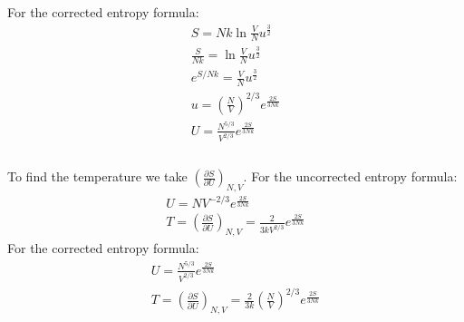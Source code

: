 \documentclass[a4paper,12pt]{article}
\numberwithin{equation}{section}
\begin{document}
For the corrected entropy formula:
\begin{gather}
 S=Nk\ln{\frac{V}{N}u^{\frac{3}{2}}}\\
 \frac{S}{Nk}=\ln{\frac{V}{N}u^{\frac{3}{2}}}\\
 e^{S/Nk}=\frac{V}{N}u^{\frac{3}{2}}\\
 u=(\frac{N}{V})^{2/3}e^{\frac{2S}{3Nk}}\\
 U=\frac{N^{5/3}}{V^{2/3}}e^{\frac{2S}{3Nk}}\\
\end{gather}
\\
To find the temperature we take $\left(\frac{\partial S}{\partial U}\right)_{N,V}$.
For the uncorrected entropy formula:
\begin{gather}
 U=NV^{-2/3}e^{\frac{2S}{3Nk}}\\
 T=\left(\frac{\partial S}{\partial U}\right)_{N,V}=
    \frac{2}{3kV^{2/3}}e^{\frac{2S}{3Nk}}
\end{gather}
For the corrected entropy formula:
\begin{gather}
 U=\frac{N^{5/3}}{V^{2/3}}e^{\frac{2S}{3Nk}}\\
 T=\left(\frac{\partial S}{\partial U}\right)_{N,V}=
  \frac{2}{3k}\left(\frac{N}{V}\right)^{2/3}  e^{\frac{2S}{3Nk}}
\end{gather}
\end{document}
